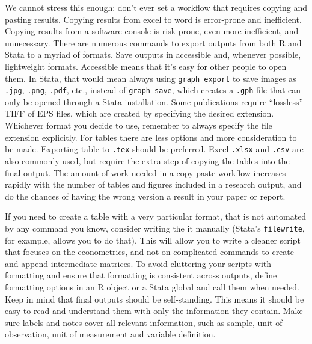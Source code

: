 We cannot stress this enough: don't ever set a workflow that requires copying and pasting results.
Copying results from excel to word is error-prone and inefficient.
Copying results from a software console is risk-prone, even more inefficient, and unnecessary.
There are numerous commands to export outputs from both R and Stata to a myriad of formats.
Save outputs in accessible and, whenever possible, lightweight formats.
Accessible means that it's easy for other people to open them.
In Stata, that would mean always using \texttt{graph export} to save images as \texttt{.jpg}, \texttt{.png}, \texttt{.pdf}, etc., 
instead of \texttt{graph save}, which creates a \texttt{.gph} file that can only be opened through a Stata installation.
Some publications require ``lossless'' TIFF of EPS files, which are created by specifying the desired extension.
Whichever format you decide to use, remember to always specify the file extension explicitly.
For tables there are less options and more consideration to be made.
Exporting table to \texttt{.tex} should be preferred. 
Excel \texttt{.xlsx} and \texttt{.csv} are also commonly used, 
but require the extra step of copying the tables into the final output.
The amount of work needed in a copy-paste workflow increases rapidly with the number of tables and figures included in a research output, 
and do the chances of having the wrong version a result in your paper or report.


If you need to create a table with a very particular format, that is not automated by any command you know, consider writing the it manually 
(Stata's \texttt{filewrite}, for example, allows you to do that).
This will allow you to write a cleaner script that focuses on the econometrics, and not on complicated commands to create and append intermediate matrices.
To avoid cluttering your scripts with formatting and ensure that formatting is consistent across outputs,
define formatting options in an R object or a Stata global and call them when needed.
Keep in mind that final outputs should be self-standing.
This means it should be easy to read and understand them with only the information they contain.
Make sure labels and notes cover all relevant information, such as sample, unit of observation, unit of measurement and variable definition.



